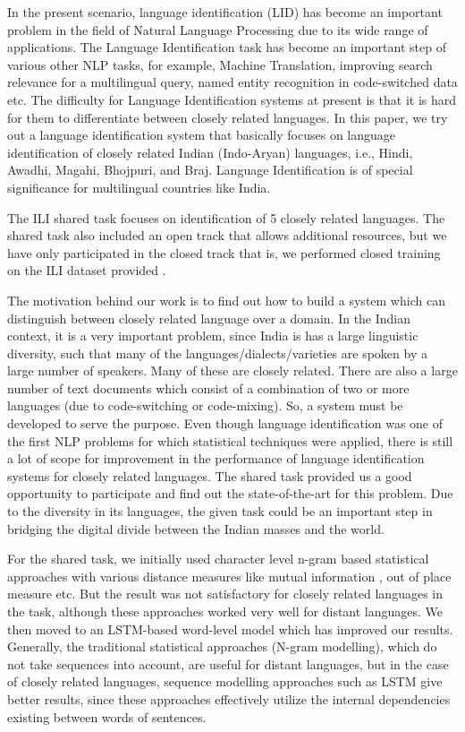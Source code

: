 \documentclass[11pt]{article}
\begin{document}
In the present scenario, language identification (LID) has become an important problem in the field of
Natural Language Processing due to its wide range of applications. The Language Identification task has become an important step of various other NLP tasks, for example, Machine Translation, improving search
relevance for a multilingual query, named entity recognition in code-switched data etc. The difficulty for Language Identification systems at present is that it is hard for them to differentiate between closely related languages. In this paper, we try out a language
identification system that basically focuses on language identification of closely related Indian (Indo-Aryan) languages, i.e., Hindi, Awadhi, Magahi, Bhojpuri, and Braj. Language Identification is of special significance for multilingual countries like India.

The ILI shared task \cite{vardial2018report} focuses on identification of 5 closely related languages. The shared task also included an open track that allows additional resources, but we have only participated in the closed track that is, we performed closed training on the ILI dataset provided \cite{KUMAR18.26}.
 
The motivation behind our work is to find out how to build a system which can distinguish between closely related language over a domain. In the Indian context, it is a very important problem, since India is has a large linguistic diversity, such that many of the languages/dialects/varieties are spoken by a large number of speakers. Many of these are closely related. There are also a large number of text documents which consist of a combination of two or more languages (due to code-switching or code-mixing). So, a system must be developed to serve the purpose. Even though language identification was one of the first NLP problems for which statistical techniques were applied, there is still a lot of scope for improvement in the performance of language identification systems for closely related languages. The shared task provided us a good opportunity to participate and find out the state-of-the-art for this problem. Due to the diversity in its languages, the given task could be an important step in bridging the digital divide between the Indian masses and the world.

For the shared task, we initially used character level n-gram based statistical approaches with various distance measures like mutual information \cite{zamora2014tweets}, out of place measure \cite{singh2014language} etc. But the result was not satisfactory for closely related languages in the task, although these approaches worked very well for distant languages. We then moved to an LSTM-based word-level model which has improved our results. Generally, the traditional statistical approaches (N-gram modelling), which do not take sequences into account, are useful for distant languages, but in the case of closely related languages, sequence modelling approaches such as LSTM give better results, since these approaches effectively utilize the internal dependencies existing between words of sentences.
\end{document}
